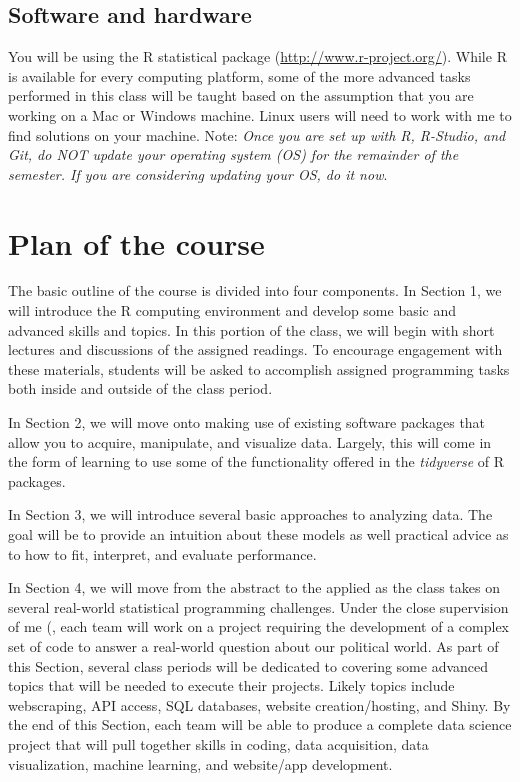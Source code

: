 \documentclass[11pt]{article}
\begin{document}




\subsection*{Software and hardware}

You will be using the R statistical package
(\url{http://www.r-project.org/}). While R is available for every
computing platform, some of the more advanced tasks performed in this
class will be taught based on the assumption that you are working on a
Mac or Windows machine.  Linux users will need to work with me to find
solutions on your machine.  Note: \textit{Once you are set up with R,
  R-Studio, and Git, do NOT update your operating system (OS) for the
  remainder of the semester.  If you are considering updating your OS,
  do it now}.



\section*{Plan of the course}

The basic outline of the course is divided into four components. In
Section 1, we will introduce the R computing environment and develop
some basic and advanced skills and topics.  In this portion of the
class, we will begin with short lectures and discussions of the
assigned readings. To encourage engagement with these materials,
students will be asked to accomplish assigned programming tasks both
inside and outside of the class period. 

In Section 2, we will move onto making use of existing software
packages that allow you to acquire, manipulate, and visualize
data. Largely, this will come in the form of learning to use some of
the functionality offered in the \textit{tidyverse} of R packages.

In Section 3, we will introduce several basic approaches to analyzing
data.  The goal will be to provide an intuition about these models as
well practical advice as to how to fit, interpret, and evaluate performance.  

In Section 4, we will move from the abstract to the applied as the
class takes on several real-world statistical programming challenges.
Under the close supervision of me (, each team will work on a project
requiring the development of a complex set of code to answer a
real-world question about our political world.  As part of this
Section, several class periods will be dedicated to covering some
advanced topics that will be needed to execute their projects.  Likely
topics include webscraping, API access, SQL databases, website
creation/hosting, and Shiny.  By the end of this Section, each team
will be able to produce a complete data science project that will pull
together skills in coding, data acquisition, data visualization,
machine learning, and website/app development.
\end{document}
